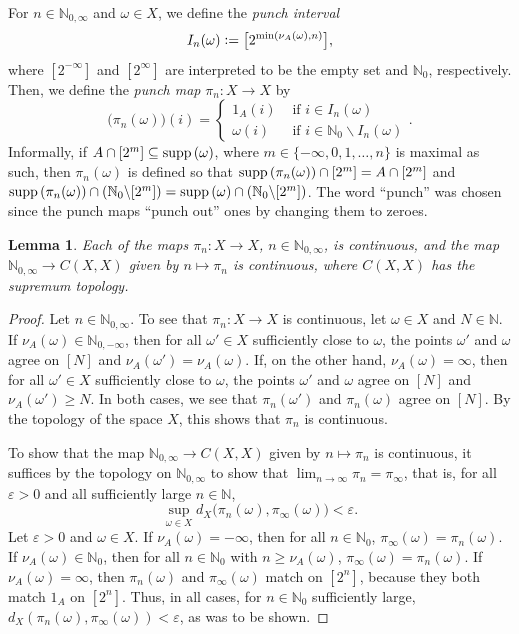 \documentclass[letter,11pt]{article}
\theoremstyle{plain}
\newtheorem{lemma}[theorem]{Lemma}
\theoremstyle{definition}
\theoremstyle{plain}
\theoremstyle{plain}
\numberwithin{equation}{section}
\newcommand{\supp}{{\normalfont\text{supp}}\,}
\newcommand{\eps}{\epsilon}
\newcommand{\N}{\mathbb{N}}
\newcommand{\defeq}{\vcentcolon=}
\renewcommand{\epsilon}{\varepsilon}
\renewcommand{\geq}{\geqslant}
\renewcommand{\setminus}{\backslash}
\begin{document}
For $n \in \N_{0,\infty}$ and $\omega \in X$, we define the \emph{punch interval}
\[I_n(\omega) \defeq \big[2^{\min(\nu_A(\omega),n)} \big],\]
where $[2^{-\infty}]$ and $[2^{\infty}]$ are interpreted to be the empty set and $\N_0$, respectively. Then, we define the \emph{punch map} $\pi_n: X \to X$ by
\[\big(\pi_n (\omega) \big)(i) = \begin{cases} 1_A(i) & \text{ if $i \in I_n(\omega)$} \\ \omega(i) & \text{ if $i \in \N_0 \setminus I_n(\omega)$} \end{cases}.\]
Informally, if $A \cap [2^m] \subseteq \supp(\omega)$, where $m \in \{-\infty, 0, 1, \ldots, n\}$ is maximal as such, then $\pi_n(\omega)$ is defined so that $\supp(\pi_n(\omega)) \cap [2^m] = A \cap [2^m]$ and $\supp(\pi_n(\omega)) \cap (\N_0 \setminus [2^m]) = \supp(\omega) \cap (\N_0 \setminus [2^m])$. The word ``punch'' was chosen since the punch maps ``punch out'' ones by changing them to zeroes.


\begin{lemma}
\label{lemma_continuity_of_family_of_punches}
    Each of the maps $\pi_n: X \to X$, $n \in \N_{0,\infty}$, is continuous, and the map $\N_{0,\infty} \to C(X,X)$ given by $n \mapsto \pi_n$ is continuous, where $C(X,X)$ has the supremum topology.
\end{lemma}

\begin{proof}
    Let $n \in \N_{0,\infty}$.  To see that $\pi_n: X \to X$ is continuous, let $\omega \in X$ and $N \in \N$.  If $\nu_A(\omega) \in \N_{0,-\infty}$, then for all $\omega' \in X$ sufficiently close to $\omega$, the points $\omega'$ and $\omega$ agree on $[N]$ and $\nu_A(\omega') = \nu_A(\omega)$.  If, on the other hand, $\nu_A(\omega) = \infty$, then for all $\omega' \in X$ sufficiently close to $\omega$, the points $\omega'$ and $\omega$ agree on $[N]$ and $\nu_A(\omega') \geq N$.  In both cases, we see that $\pi_n(\omega')$ and $\pi_n(\omega)$ agree on $[N]$.  By the topology of the space $X$, this shows that $\pi_n$ is continuous.

    To show that the map $\N_{0,\infty} \to C(X,X)$ given by $n \mapsto \pi_n$ is continuous, it suffices by the topology on $\N_{0,\infty}$ to show that $\lim_{n \to \infty} \pi_n = \pi_\infty$, that is, for all $\eps > 0$ and all sufficiently large $n \in \N$,
    \[\sup_{\omega \in X} d_X\big(\pi_n(\omega), \pi_\infty(\omega) \big) < \eps.\]
    Let $\eps > 0$ and $\omega \in X$. If $\nu_A(\omega) = -\infty$, then for all $n \in \N_0$, $\pi_\infty(\omega) = \pi_n(\omega)$. If $\nu_A(\omega) \in \N_0$, then for all $n \in \N_0$ with $n \geq \nu_A(\omega)$, $\pi_\infty(\omega) = \pi_n(\omega)$. If $\nu_A(\omega) = \infty$, then $\pi_n(\omega)$ and $\pi_\infty(\omega)$ match on $[2^n]$, because they both match $1_A$ on $[2^n]$.  Thus, in all cases, for $n \in \N_0$ sufficiently large, $d_X(\pi_n(\omega), \pi_\infty(\omega)) < \eps$, as was to be shown.
\end{proof}
\end{document}

